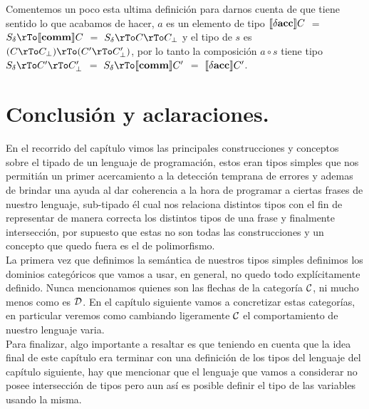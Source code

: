 \noindent
Comentemos un poco esta ultima definici\'on para darnos cuenta de que 
tiene sentido lo que acabamos de hacer, $a$ es un elemento de tipo 
$\llbracket  \delta \textbf{acc}  \rrbracket C$ $=$ $S_{\delta} \rTo \semBrcks{ \commt }C$ $=$ 
$S_{\delta} \rTo C \rTo C_\bot$ y el tipo de $s$ es 
$(C \rTo C_\bot) \rTo (C' \rTo C'_\bot)$, por lo tanto la composici\'on
$a \circ s$ tiene tipo $S_{\delta} \rTo C' \rTo C'_\bot$ $=$ 
$S_{\delta} \rTo \semBrcks{ \commt }C'$ $=$ $\llbracket  \delta \textbf{acc}  \rrbracket C'$.

\section{Conclusi\'on y aclaraciones.}

En el recorrido del cap\'itulo vimos las principales construcciones y
conceptos sobre el tipado de un lenguaje de programaci\'on, estos eran
tipos simples que nos permiti\'an un primer acercamiento a la detecci\'on
temprana de errores y ademas de brindar una ayuda al dar coherencia a la
hora de programar a ciertas frases de nuestro lenguaje, sub-tipado \'el
cual nos relaciona distintos tipos con el fin de representar de manera
correcta los distintos tipos de una frase y finalmente intersecci\'on, 
por supuesto que estas no son todas las construcciones y un concepto que 
quedo fuera es el de polimorfismo.\\

La primera vez que definimos la sem\'antica de nuestros tipos simples
definimos los dominios categ\'oricos que vamos a usar, en general, 
no quedo todo expl\'icitamente definido. Nunca mencionamos quienes son
las flechas de la categor\'ia $\mathcal{C}$, ni mucho menos como es $\mathcal{D}$. En el
cap\'itulo siguiente vamos a concretizar estas categor\'ias, en particular
veremos como cambiando ligeramente $\mathcal{C}$ el comportamiento de nuestro 
lenguaje varia.\\

Para finalizar, algo importante a resaltar es que teniendo en cuenta que
la idea final de este cap\'itulo era terminar con una definici\'on 
de los tipos del lenguaje del cap\'itulo siguiente, hay que mencionar que
el lenguaje que vamos a considerar no posee intersecci\'on de tipos pero
aun as\'i es posible definir el tipo de las variables usando la misma.
